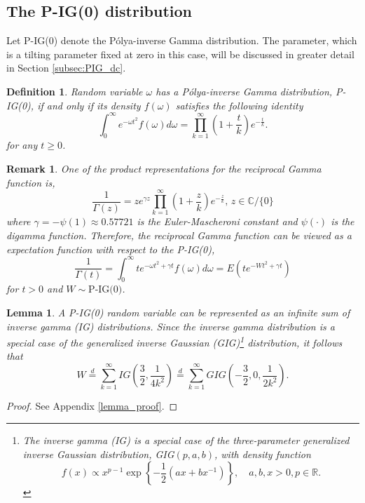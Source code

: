 \documentclass{statsoc}
\newcommand{\Polya}{P\'olya}
\newtheorem{lemma}{Lemma}
\newtheorem{definition}{Definition}
\newtheorem{remark}{Remark}
\begin{document}
\subsection{The P-IG(0) distribution}
\label{subsec:PIG_d0}
Let P-IG(0) denote the \Polya-inverse Gamma distribution. The parameter, which is a tilting parameter fixed at zero in this case, will be discussed in greater detail in Section \ref{subsec:PIG_dc}.  
\begin{definition}
Random variable $\omega$ has a  P\'olya-inverse Gamma distribution, P-IG(0), if and only if its density $f(\omega)$ satisfies the following identity
\begin{equation}\label{LT_b_0}
\int_{0}^\infty e^{-\omega t^2} f(\omega) d \omega = \prod_{k=1}^\infty \left(1 + \frac{t}{k}\right) e^{- \frac{t}{k}}.
\end{equation}
for any $t \geq 0$.
\end{definition}

\begin{remark}
\label{rmk:remark_1}
One of the product representations for the reciprocal Gamma function is,
$$
\frac{1}{\Gamma(z)} = z e^{\gamma z}\prod_{k=1}^\infty \left(1 + \frac{z}{k}\right) e^{-\frac{z}{k}}, \, z\in \mathbb{C}\slash \{0\}
$$
where $\gamma = -\psi(1) \approx 0.57721$ is the Euler-Mascheroni constant and $\psi(\cdot)$ is the digamma function. Therefore, the reciprocal Gamma function can be viewed as a expectation function with respect to the P-IG(0), 
$$
\frac{1}{\Gamma(t)} = \int_{0}^\infty te^{-\omega t^2 + \gamma t} f(\omega) d \omega = E\left(te^{-W t^2 + \gamma t}  \right)
$$
for $t>0$ and $W\sim \text{P-IG(0)}$.
\end{remark}

\begin{lemma}\label{lemma1}
A P-IG(0) random variable can be represented as an infinite sum of inverse gamma (IG) distributions. Since the inverse gamma distribution is a special case of the generalized inverse Gaussian (GIG)\footnote{The inverse gamma (IG) is a special case of the three-parameter generalized inverse Gaussian distribution, GIG$\left(p, a, b\right)$, with density function
$$
f\left(x\right) \propto x^{p - 1}\exp\left\{-\frac{1}{2}\left(a x + bx^{-1}\right)\right\}, \quad a,b,x > 0, p\in\mathbb{R}.
$$
} distribution, it follows that 
\begin{equation}
W \overset{d}{=}\sum_{k=1}^\infty IG\left(\frac{3}{2}, \frac{1}{4k^2}\right)
\overset{d}{=}   \sum_{k=1}^\infty GIG
\left(-\frac{3}{2}, 0,  \frac{1}{2k^2}\right).
\end{equation}
\end{lemma}
\begin{proof}
See Appendix \ref{lemma_proof}.
\end{proof}
\end{document}
